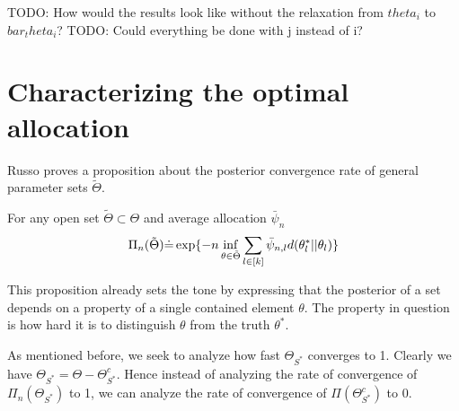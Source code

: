 
TODO: How would the results look like without the relaxation from $theta_i$ to $bar_theta_i$?
TODO: Could everything be done with j instead of i?

\section{Characterizing the optimal allocation}\label{section:optimal_statements}
Russo proves a proposition about the posterior convergence rate of general parameter sets $\tilde{\Theta}$.

\begin{proposition}\label{proposition:prop5}
  For any open set $\tilde{\Theta} \subset \Theta$ and average allocation $\bar{\psi}_n$
  \[\Pi_n(\tilde{\Theta}) \dot{=} \exp\{-n \inf_{\theta \in \tilde{\Theta}} \sum_{l \in [k]} \bar{\psi}_{n, l} d(\theta^*_l || \theta_l)\}\]
\end{proposition}

This proposition already sets the tone by expressing that the posterior of a set depends on a property of a single contained element $\theta$. The property in question is how hard it is to distinguish $\theta$ from the truth $\theta^*$.

As mentioned before, we seek to analyze how fast $\Theta_{S^*}$ converges to 1. Clearly we have $\Theta_{S^*} = \Theta - \Theta_{S^*}^c$. Hence instead of analyzing the rate of convergence of $\Pi_n(\Theta_{S^*})$ to 1, we can analyze the rate of convergence of $\Pi(\Theta_{S^*}^c)$ to 0.

